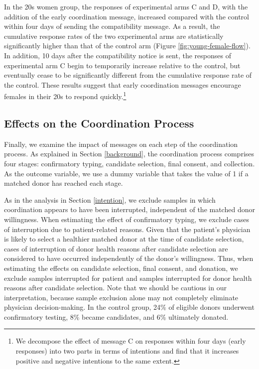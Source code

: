 \documentclass[
  11pt,
  a4paper
]{article}
\begin{document}
In the 20s women group, the responses of experimental arms C and D, with the addition of the early coordination message, increased compared with the control within four days of sending the compatibility message. As a result, the cumulative response rates of the two experimental arms are statistically significantly higher than that of the control arm (Figure \ref{fig:young-female-flow}). In addition, 10 days after the compatibility notice is sent, the responses of experimental arm C begin to temporarily increase relative to the control, but eventually cease to be significantly different from the cumulative response rate of the control. These results suggest that early coordination messages encourage females in their 20s to respond quickly.\footnote{We decompose the effect of message C on responses within four days (early responses) into two parts in terms of intentions and find that it increases positive and negative intentions to the same extent.}

\hypertarget{process}{%
\subsection{Effects on the Coordination Process}\label{process}}

Finally, we examine the impact of messages on each step of the coordination process. As explained in Section \ref{background}, the coordination process comprises four stages: confirmatory typing, candidate selection, final consent, and collection. As the outcome variable, we use a dummy variable that takes the value of 1 if a matched donor has reached each stage.

As in the analysis in Section \ref{intention}, we exclude samples in which coordination appears to have been interrupted, independent of the matched donor willingness. When estimating the effect of confirmatory typing, we exclude cases of interruption due to patient-related reasons. Given that the patient's physician is likely to select a healthier matched donor at the time of candidate selection, cases of interruption of donor health reasons after candidate selection are considered to have occurred independently of the donor's willingness. Thus, when estimating the effects on candidate selection, final consent, and donation, we exclude samples interrupted for patient and samples interrupted for donor health reasons after candidate selection. Note that we should be cautious in our interpretation, because sample exclusion alone may not completely eliminate physician decision-making. In the control group, 24\% of eligible donors underwent confirmatory testing, 8\% became candidates, and 6\% ultimately donated.
\end{document}
